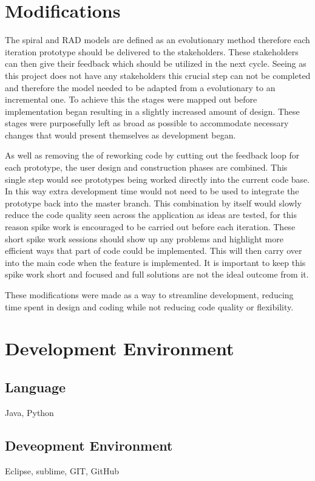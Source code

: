 \section{Modifications}
The spiral and RAD models are defined as an evolutionary method therefore each iteration prototype should be delivered to the stakeholders. These stakeholders can then give their feedback which should be utilized in the next cycle. Seeing as this project does not have any stakeholders this crucial step can not be completed and therefore the model needed to be adapted from a evolutionary to an incremental one. To achieve this the stages were mapped out before implementation began resulting in a slightly increased amount of design. These stages were purposefully left as broad as possible to accommodate necessary changes that would present themselves as development began.

As well as removing the of reworking code by cutting out the feedback loop for each prototype, the user design and construction phases are combined. This single step would see prototypes being worked directly into the current code base. In this way extra development time would not need to be used to integrate the prototype back into the master branch. This combination by itself would slowly reduce the code quality seen across the application as ideas are tested, for this reason spike work is encouraged to be carried out before each iteration. These short spike work sessions should show up any problems and highlight more efficient ways that part of code could be implemented. This will then carry over into the main code when the feature is implemented. It is important to keep this spike work short and focused and full solutions are not the ideal outcome from it.

These modifications were made as a way to streamline development, reducing time spent in design and coding while not reducing code quality or flexibility.




\section{Development Environment}

\subsection{Language}
Java, Python

\subsection{Deveopment Environment}
Eclipse, sublime, GIT, GitHub

